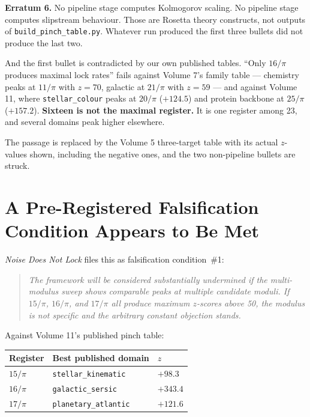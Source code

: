 \documentclass[11pt, letterpaper, openany]{book}
\begin{document}
\begin{erratumbox}
\textbf{Erratum 6.} No pipeline stage computes Kolmogorov scaling. No pipeline stage computes
slipstream behaviour. Those are Rosetta theory constructs, not outputs of
\texttt{build\_pinch\_table.py}. Whatever run produced the first three bullets did not produce
the last two.

\medskip
\noindent And the first bullet is contradicted by our own published tables. ``Only $16/\pi$
produces maximal lock rates'' fails against Volume 7's family table --- chemistry peaks at
$11/\pi$ with $z = 70$, galactic at $21/\pi$ with $z = 59$ --- and against Volume 11, where
\texttt{stellar\_colour} peaks at $20/\pi$ ($+124.5$) and protein backbone at $25/\pi$
($+157.2$). \textbf{Sixteen is not the maximal register.} It is one register among 23, and
several domains peak higher elsewhere.

\medskip
\noindent The passage is replaced by the Volume 5 three-target table with its actual $z$-values
shown, including the negative ones, and the two non-pipeline bullets are struck.
\end{erratumbox}

\section{A Pre-Registered Falsification Condition Appears to Be Met}

\emph{Noise Does Not Lock} files this as falsification condition~\#1:

\begin{quote}
\itshape The framework will be considered substantially undermined if the multi-modulus sweep
shows comparable peaks at multiple candidate moduli. If $15/\pi$, $16/\pi$, and $17/\pi$ all
produce maximum $z$-scores above 50, the modulus is not specific and the arbitrary constant
objection stands.
\end{quote}

Against Volume 11's published pinch table:

\begin{table}[H]
\centering
\small
\begin{tabular}{@{}lll@{}}
\toprule
\textbf{Register} & \textbf{Best published domain} & \textbf{$z$} \\
\midrule
$15/\pi$ & \texttt{stellar\_kinematic} & $\mathbf{+98.3}$ \\
$16/\pi$ & \texttt{galactic\_sersic} & $\mathbf{+343.4}$ \\
$17/\pi$ & \texttt{planetary\_atlantic} & $\mathbf{+121.6}$ \\
\bottomrule
\end{tabular}
\end{table}
\end{document}

